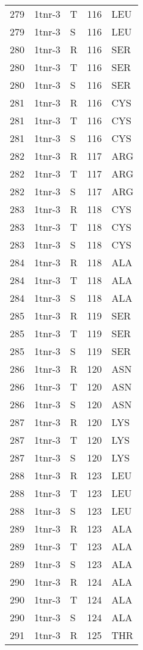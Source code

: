 \begin{tiny}
\begin{longtable}[l]{l|l|l|l|l}
	279 & 1tnr-3 & T & 116 & LEU \\
	279 & 1tnr-3 & S & 116 & LEU \\
	280 & 1tnr-3 & R & 116 & SER \\
	280 & 1tnr-3 & T & 116 & SER \\
	280 & 1tnr-3 & S & 116 & SER \\
	281 & 1tnr-3 & R & 116 & CYS \\
	281 & 1tnr-3 & T & 116 & CYS \\
	281 & 1tnr-3 & S & 116 & CYS \\
	282 & 1tnr-3 & R & 117 & ARG \\
	282 & 1tnr-3 & T & 117 & ARG \\
	282 & 1tnr-3 & S & 117 & ARG \\
	283 & 1tnr-3 & R & 118 & CYS \\
	283 & 1tnr-3 & T & 118 & CYS \\
	283 & 1tnr-3 & S & 118 & CYS \\
	284 & 1tnr-3 & R & 118 & ALA \\
	284 & 1tnr-3 & T & 118 & ALA \\
	284 & 1tnr-3 & S & 118 & ALA \\
	285 & 1tnr-3 & R & 119 & SER \\
	285 & 1tnr-3 & T & 119 & SER \\
	285 & 1tnr-3 & S & 119 & SER \\
	286 & 1tnr-3 & R & 120 & ASN \\
	286 & 1tnr-3 & T & 120 & ASN \\
	286 & 1tnr-3 & S & 120 & ASN \\
	287 & 1tnr-3 & R & 120 & LYS \\
	287 & 1tnr-3 & T & 120 & LYS \\
	287 & 1tnr-3 & S & 120 & LYS \\
	288 & 1tnr-3 & R & 123 & LEU \\
	288 & 1tnr-3 & T & 123 & LEU \\
	288 & 1tnr-3 & S & 123 & LEU \\
	289 & 1tnr-3 & R & 123 & ALA \\
	289 & 1tnr-3 & T & 123 & ALA \\
	289 & 1tnr-3 & S & 123 & ALA \\
	290 & 1tnr-3 & R & 124 & ALA \\
	290 & 1tnr-3 & T & 124 & ALA \\
	290 & 1tnr-3 & S & 124 & ALA \\
	291 & 1tnr-3 & R & 125 & THR \\

\end{longtable}
\end{tiny}
